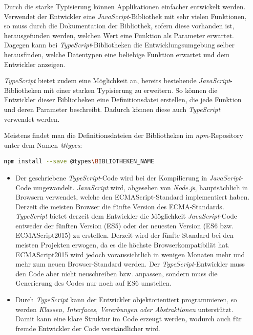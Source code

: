 Durch die starke Typisierung können Applikationen einfacher entwickelt werden.
Verwendet der Entwickler eine \textit{JavaScript}-Bibliothek mit sehr vielen Funktionen, so muss durch die Dokumentation der Bibliothek, sofern diese vorhanden ist, herausgefunden werden, welchen Wert eine Funktion als Parameter erwartet.
Dagegen kann bei \textit{TypeScript}-Bibliotheken die Entwicklungsumgebung selber herausfinden, welche Datentypen eine beliebige Funktion erwartet und dem Entwickler anzeigen. 

\textit{TypeScript} bietet zudem eine Möglichkeit an, bereits bestehende \textit{JavaScript}-Bibliotheken mit einer starken Typisierung zu erweitern. So können die Entwickler dieser Bibliotheken eine Definitionsdatei erstellen, die jede Funktion und deren Parameter beschreibt. Dadurch können diese auch \textit{TypeScript} verwendet werden.

Meistens findet man die Definitionsdateien der Bibliotheken im \textit{npm}-Repository unter dem Namen \textit{@types}:

\lstset{escapechar=?,style=customjava}
\begin{lstlisting}[language=bash, caption={Installieren einer Definitionsdatei von einer \textit{JavaScript}-Bibliothek}]
npm install --save @types\BIBLIOTHEKEN_NAME
\end{lstlisting}
\lstset{escapechar=@,style=customjava}
\clearpage
{}
\begin{itemize}
    \item Der geschriebene \textit{TypeScript}-Code wird bei der Kompilierung in \textit{JavaScript}-Code umgewandelt.  \textit{JavaScript} wird, abgesehen von \textit{Node.js}, hauptsächlich in Browsern verwendet, welche den ECMAScript-Standard implementiert haben. Derzeit die meisten Browser die fünfte Version des ECMA-Standards. \textit{TypeScript} bietet derzeit dem Entwickler die Möglichkeit \textit{JavaScript}-Code entweder der fünften Version (ES5) oder der neuesten Version (ES6 bzw. ECMAScript2015) zu erstellen. Derzeit wird der fünfte Standard bei den meisten Projekten erwogen, da es die höchste Browserkompatibilät hat. ECMAScript2015 wird jedoch voraussichtlich in wenigen Monaten mehr und mehr zum neuen Browser-Standard werden. \cite{ecma} Der \textit{TypeScript}-Entwickler muss den Code aber nicht neuschreiben bzw. anpassen, sondern muss die Generierung des Codes nur noch auf ES6 umstellen.
    \item Durch \textit{TypeScript} kann der Entwickler objektorientiert programmieren, so werden \textit{Klassen, Interfaces, Vererbungen oder Abstraktionen} unterstützt. Damit kann eine klare Struktur im Code erzeugt werden, wodurch auch für fremde Entwickler der Code verständlicher wird.
\end{itemize}

